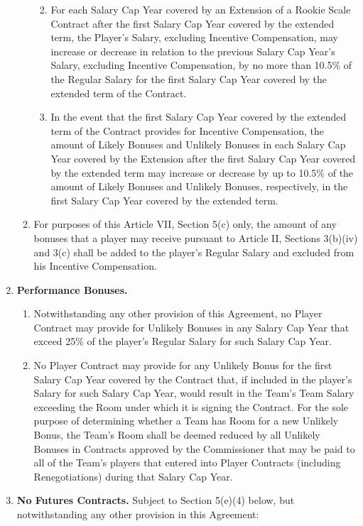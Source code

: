 \documentclass[
]{book}
\providecommand{\tightlist}{%
  \setlength{\itemsep}{0pt}\setlength{\parskip}{0pt}}
\begin{document}
\begin{enumerate}
\begin{enumerate}
    \begin{enumerate}
    \def\labelenumiii{(\roman{enumiii})}
    \tightlist
    \item
      For each Salary Cap Year covered by an Extension of a Rookie Scale Contract after the first Salary Cap Year covered by the extended term, the Player's Salary, excluding Incentive Compensation, may increase or decrease in relation to the previous Salary Cap Year's Salary, excluding Incentive Compensation, by no more than 10.5\% of the Regular Salary for the first Salary Cap Year covered by the extended term of the Contract.
    \item
      In the event that the first Salary Cap Year covered by the extended term of the Contract provides for Incentive Compensation, the amount of Likely Bonuses and Unlikely Bonuses in each Salary Cap Year covered by the Extension after the first Salary Cap Year covered by the extended term may increase or decrease by up to 10.5\% of the amount of Likely Bonuses and Unlikely Bonuses, respectively, in the first Salary Cap Year covered by the extended term.
    \end{enumerate}
  \item
    For purposes of this Article VII, Section 5(c) only, the amount of any bonuses that a player may receive pursuant to Article II, Sections 3(b)(iv) and 3(c) shall be added to the player's Regular Salary and excluded from his Incentive Compensation.
  \end{enumerate}
\item
  \textbf{Performance Bonuses.}

  \begin{enumerate}
  \def\labelenumii{(\arabic{enumii})}
  \tightlist
  \item
    Notwithstanding any other provision of this Agreement, no Player Contract may provide for Unlikely Bonuses in any Salary Cap Year that exceed 25\% of the player's Regular Salary for such Salary Cap Year.
  \item
    No Player Contract may provide for any Unlikely Bonus for the first Salary Cap Year covered by the Contract that, if included in the player's Salary for such Salary Cap Year, would result in the Team's Team Salary exceeding the Room under which it is signing the Contract. For the sole purpose of determining whether a Team has Room for a new Unlikely Bonus, the Team's Room shall be deemed reduced by all Unlikely Bonuses in Contracts approved by the Commissioner that may be paid to all of the Team's players that entered into Player Contracts (including Renegotiations) during that Salary Cap Year.
  \end{enumerate}
\item
  \textbf{No Futures Contracts.} Subject to Section 5(e)(4) below, but notwithstanding any other provision in this Agreement:


\end{enumerate}
\end{document}

